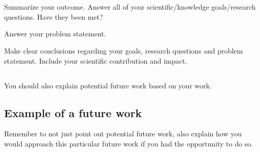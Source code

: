 \section{}\label{sec:conclusions}

Summarize your outcome. Answer all of your scientific/knowledge goals/research
questions. Have they been met?

Answer your problem statement.

Make clear conclusions regarding your goals, research questions and problem
statement. Include your scientific contribution and impact.

\subsection{}\label{subsec:future_work}
You should also explain potential future work based on your work.

\subsection{Example of a future work}\label{subsec:example_future_work}
Remember to not just point out potential future work, also explain how you would
approach this particular future work if you had the opportunity to do so.


